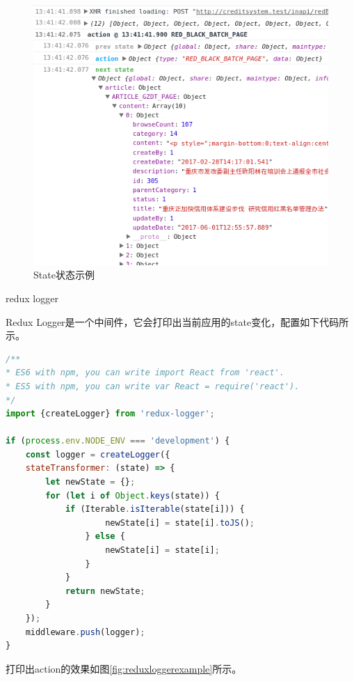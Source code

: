 \documentclass[12pt]{book}
\makeatletter
\numberwithin{dummy}{section}
\theoremstyle{ocrenumbox}
\theoremstyle{blacknumex}
\theoremstyle{blacknumbox}
\theoremstyle{ocrenum}
\renewcommand\paragraph{\@startsection{paragraph}{4}{\z@}
	{-2ex \@plus-.2ex \@minus .2ex}
	{.1ex}
	{\normalfont\small\sffamily\bfseries}}
\makeatother
\begin{document}
\begin{figure}[htbp]
	\centering
	\includegraphics[scale=0.6]{statedemo.png}
	\caption{State状态示例}
	\label{fig:statedemo}
\end{figure}



\paragraph{redux logger}

Redux Logger是一个中间件，它会打印出当前应用的state变化，配置如下代码所示。

\begin{lstlisting}[language=Javascript]
/**
* ES6 with npm, you can write import React from 'react'. 
* ES5 with npm, you can write var React = require('react').
*/
import {createLogger} from 'redux-logger';

if (process.env.NODE_ENV === 'development') {
	const logger = createLogger({
	stateTransformer: (state) => {
		let newState = {};
		for (let i of Object.keys(state)) {
			if (Iterable.isIterable(state[i])) {
					newState[i] = state[i].toJS();
				} else {
					newState[i] = state[i];
				}
			}
			return newState;
		}
	});
	middleware.push(logger);
}
\end{lstlisting}

打印出action的效果如图\ref{fig:reduxloggerexample}所示。
\end{document}
